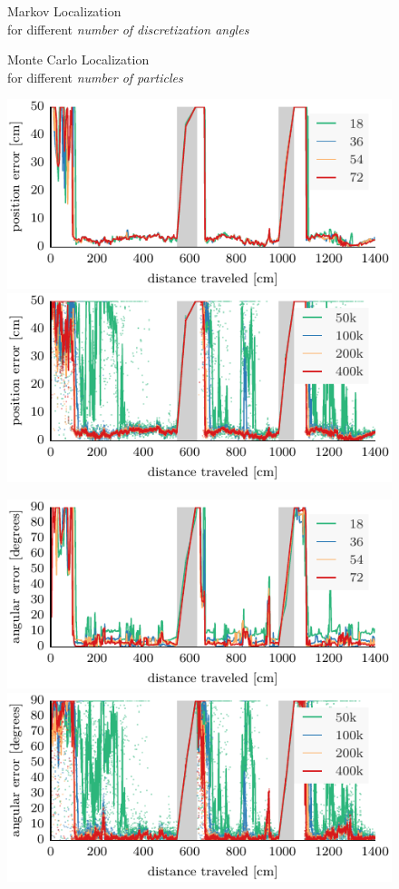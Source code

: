 \documentclass{svmult}
\begin{document}
\begin{figure}

\begin{minipage}{.5\columnwidth}
\begin{center}
Markov Localization\\for different \emph{number of discretization angles}
\end{center}
\end{minipage}
\hfill
\begin{minipage}{.5\columnwidth}
\begin{center}
Monte Carlo Localization\\for different \emph{number of particles}
\end{center}
\end{minipage}

\vspace{.2em}

\includegraphics[width=.5\columnwidth]{ml-whole_random_long-xy} \hfill \includegraphics[width=.5\columnwidth]{mcl-whole_random_long-xy}

\vspace{.2em}

\includegraphics[width=.5\columnwidth]{ml-whole_random_long-theta} \hfill \includegraphics[width=.5\columnwidth]{mcl-whole_random_long-theta}


\end{figure}
\end{document}
